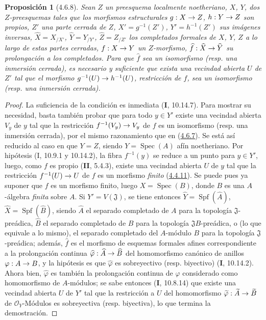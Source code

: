\documentclass[10pt,oneside,openany]{book}
\theoremstyle{egaenv}\newtheorem*{env}{---}
\theoremstyle{egastatement}
\newtheorem*{proposition}{Proposición}
\theoremstyle{egadescription}
\renewcommand{\to}{\mathchoice{\longrightarrow}{\rightarrow}{\rightarrow}{\rightarrow}}
\begin{document}
\begin{proposition}[4.6.8]
\label{III.4.6.8-fr}
Sean $Z$ un preesquema localmente noetheriano, $X$, $Y$, dos $Z$-preesquemas
tales que los morfismos estructurales $g:X\to Z$, $h:Y\to Z$ son propios,
$Z'$ una parte cerrada de $Z$, $X'=g^{-1}(Z')$, $Y'=h^{-1}(Z')$ sus imágenes
inversas,
$\widehat X=X_{/X'}$, $\widehat Y=Y_{/Y'}$, $\widehat Z=Z_{/Z'}$
los completados formales de $X$, $Y$, $Z$ a lo largo de estas partes cerradas,
$f:X\to Y$ un $Z$-morfismo, $\widehat f:\widehat X\to\widehat Y$ su
prolongación a los completados. Para que $\widehat f$ sea un isomorfismo (\textup{resp.}
una inmersión cerrada), es necesario y suficiente que exista una vecindad abierta
$U$ de $Z'$ tal que el morfismo $g^{-1}(U)\to h^{-1}(U)$, restricción de
$f$, sea un isomorfismo (\textup{resp.} una inmersión cerrada).
\end{proposition}

\begin{proof}
La suficiencia de la condición es inmediata (\textbf{I}, 10.14.7). Para mostrar su
necesidad, basta también probar que para todo $y\in Y'$ existe una
vecindad abierta $V_y$ de $y$ tal que la restricción
$f^{-1}(V_y)\to V_y$ de $f$ es un isomorfismo (resp. una inmersión
cerrada), por el mismo razonamiento que en
(\hyperref[III.4.6.7-fr]{4.6.7}). Se está así reducido al caso en que $Y=Z$,
siendo $Y=\operatorname{Spec}(A)$ afín noetheriano. Por hipótesis
(I, 10.9.1 y 10.14.2), la fibra $f^{-1}(y)$ se reduce a un punto para
$y\in Y'$, luego, como $f$ es propio (\textbf{II}, 5.4.3), existe una vecindad
abierta $U$ de $y$ tal que la restricción $f^{-1}(U)\to U$ de $f$ es un
morfismo \emph{finito} (\hyperref[III.4.4.11-fr]{4.4.11}). Se puede pues ya suponer
que $f$ es un morfismo finito, luego $X=\operatorname{Spec}(B)$, donde $B$ es
una $A$-álgebra \emph{finita} sobre $A$. Si $Y'=V(\mathfrak J)$, se tiene entonces
$\widehat Y=\operatorname{Spf}(\widehat A)$, $\widehat X=\operatorname{Spf}(\widehat B)$,
siendo $\widehat A$ el separado completado de $A$ para la topología
$\mathfrak J$-preádica, $\widehat B$ el separado completado de $B$ para la
topología $\mathfrak JB$-preádica, o (lo que equivale a lo mismo), el separado
completado del $A$-módulo $B$ para la topología $\mathfrak J$-preádica;
además, $\widehat f$ es el morfismo de esquemas formales afines correspondiente
a la prolongación continua $\widehat\varphi:\widehat A\to\widehat B$ del
homomorfismo canónico de anillos $\varphi:A\to B$, y la hipótesis es que
$\widehat\varphi$ es sobreyectivo (resp. biyectivo) (\textbf{I}, 10.14.2). Ahora bien,
$\widehat\varphi$ es también la prolongación continua de $\varphi$ considerado
como homomorfismo de $A$-módulos; se sabe entonces (\textbf{I}, 10.8.14) que existe
una vecindad abierta $U$ de $Y'$ tal que la restricción a $U$ del
homomorfismo $\widetilde\varphi:\widetilde A\to\widetilde B$ de
$\mathcal O_Y$-Módulos es sobreyectiva (resp. biyectiva), lo que termina la
demostración.
\end{proof}
\end{document}
